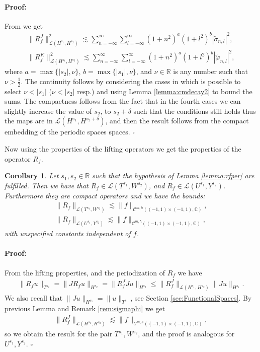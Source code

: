 \documentclass{article}
\newtheorem{corollary}[theorem]{Corollary}
\newenvironment{proof}{\paragraph{Proof:}}{\hfill$\square$}
\newcommand{\IC}{{\mathbb C}}
\newcommand{\IR}{{\mathbb R}}
\newcommand{\cmspaceh}[4]{\mathcal{C}^{#1,#2} \left( #3, #4 \right)}
\newcommand{\iinterv}{(-1,1)\times(-1,1)}
\begin{document}
\begin{proof}
From \cite[Theorem 6.1.1]{saranen2013periodic} we get
\begin{align*}
\| R^J_f\|_{ \mathcal{L}(H^{s_1},H^{s_2})}^2 \lesssim \sum_{n=-\infty}^\infty \sum_{l=-\infty}^\infty  (1+n^2)^{a}(1+l^2)^{b}|\widetilde{\sigma}_{n,l}|^2,\\
\| R^K_f\|_{ \mathcal{L}(H^{s_1},H^{s_2})}^2 \lesssim \sum_{n=-\infty}^\infty \sum_{l=-\infty}^\infty  (1+n^2)^{a}(1+l^2)^{b}|\widetilde{\varphi}_{n,l}|^2,
\end{align*}
where $a = \max\{|s_2|, \nu\}$, $b = \max\{|s_1|, \nu\} $, and $\nu \in \IR$  is any number such that $\nu > \frac{1}{2}$. The continuity follows by considering the cases in which is possible to select $\nu < |s_1|$ ($\nu < |s_2|$ resp.) and using Lemma \ref{lemma:cmdecay2} to bound the sums. 
The compactness follows from the fact that in the fourth cases we can slightly increase the value of $s_2$, to $s_2 + \delta$  such that the conditions still holds thus the maps are in $\mathcal{L}(H^{s_1},H^{s_2+\delta})$, and then the result follows from the compact embedding of the periodic spaces spaces. 
\end{proof}

Now using the properties of the lifting operators we get the properties of the operator $R_f$. 

\begin{corollary}
\label{corollary:rfop}
Let $s_1, s_2  \in \IR$ such that the hypothesis of Lemma \ref{lemma:rfper} are fulfilled. Then we have that 
$R_f  \in \mathcal{L}(T^{s_1},W^{s_2})$, and $R_f \in \mathcal{L}(U^{s_1},Y^{s_2})$. Furthermore they are compact operators and we have the bounds:
\begin{align*}
\| R_f\|_{ \mathcal{L}(T^{s_1},W^{s_2})} \lesssim \|f\|_{\cmspaceh{m}{h}{\iinterv}{\IC}},\\
\| R_f\|_{ \mathcal{L}(U^{s_1},Y^{s_2})} \lesssim \|f\|_{\cmspaceh{m}{h}{\iinterv}{\IC}},
\end{align*}
with unspecified constants independent of $f$.
\end{corollary}
\begin{proof}
From the lifting properties, and the periodization of $R_f$ we have 
\begin{align*}
\| R_f u\|_{T^{s_2}} = \|  J R_f u \|_{H^{s_2}} = \|R_f^J Ju \|_{H^{s_2}} \leq \| R_f^J\|_{\mathcal{L}(H^{s_1},H^{s_2})} \|J u \|_{H^{s_1}}. 
\end{align*}
We also recall that $\|J u \|_{H^{s_1}} = \|u\|_{T^{s_1}}$, see Section \ref{sec:FunctionalSpaces}. By previous Lemma and Remark \ref{rem:sigmaphi} we get 
\begin{align*}
\| R_f^J\|_{\mathcal{L}(H^{s_1},H^{s_2})} \lesssim \|f\|_{\cmspaceh{m}{h}{\iinterv}{\IC}},
\end{align*}
so we obtain the result for the pair $T^{s_1}, W^{s_2}$, and the proof is analogous for $U^{s_1},Y^{s_2}$.
\end{proof}
\end{document}
